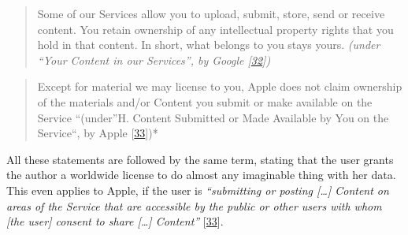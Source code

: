 \documentclass[12pt,english,a4paper,titlepage,cleardoublepage=empty,dottedtoc]{report}
\begin{document}
\begin{quote}
Some of our Services allow you to upload, submit, store, send or receive
content. You retain ownership of any intellectual property rights that
you hold in that content. In short, what belongs to you stays yours.
\emph{(under ``Your Content in our Services'', by Google
{[}\protect\hyperlink{ref-web_2016_google_terms-of-service}{32}{]})}
\end{quote}

\begin{quote}
Except for material we may license to you, Apple does not claim
ownership of the materials and/or Content you submit or make available
on the Service ``(under''H. Content Submitted or Made Available by You
on the Service``, by Apple
{[}\protect\hyperlink{ref-web_2016_apple-icloud_terms-of-service}{33}{]})*
\end{quote}

All these statements are followed by the same term, stating that the
user grants the author a worldwide license to do almost any imaginable
thing with her data. This even applies to Apple, if the user is
\emph{``submitting or posting {[}\ldots{}{]} Content on areas of the
Service that are accessible by the public or other users with whom
{[}the user{]} consent to share {[}\ldots{}{]} Content''}
{[}\protect\hyperlink{ref-web_2016_apple-icloud_terms-of-service}{33}{]}.
\end{document}
